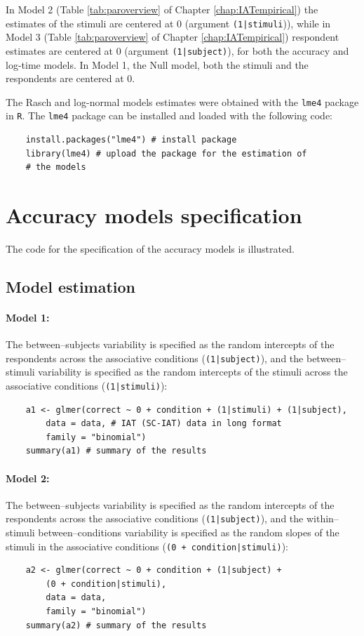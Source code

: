 \documentclass[12pt]{book}
\begin{document}
In Model 2 (Table \ref{tab:paroverview} of Chapter \ref{chap:IATempirical}) the estimates of the stimuli are centered at 0 (argument \texttt{(1|stimuli})), while in Model 3 (Table \ref{tab:paroverview} of Chapter \ref{chap:IATempirical}) respondent estimates are centered at 0 (argument \texttt{(1|subject)}), for both the accuracy and log-time models. 
In Model 1, the Null model, both the stimuli and the respondents are centered at 0. 

The Rasch and log-normal models estimates were obtained with the \texttt{lme4} package \cite{lme4}  in \texttt{R}. 
The \texttt{lme4} package can be installed and loaded with the following code: 
%
\begin{lstlisting}
	install.packages("lme4") # install package
	library(lme4) # upload the package for the estimation of 
	# the models
\end{lstlisting}


\section{Accuracy models specification}


The code for the specification of the accuracy models is illustrated. 

\subsection{Model estimation}

\paragraph*{Model 1:} 

The between--subjects variability is specified as the random intercepts of the respondents across the associative conditions (\texttt{(1|subject)}), and the between--stimuli variability is specified as the random intercepts of the stimuli across the associative conditions (\texttt{(1|stimuli)}):
%
\begin{lstlisting}
	a1 <- glmer(correct ~ 0 + condition + (1|stimuli) + (1|subject), 
		data = data, # IAT (SC-IAT) data in long format
		family = "binomial")
	summary(a1) # summary of the results  
\end{lstlisting}

\paragraph*{Model 2:} The between--subjects variability is specified as the  random intercepts of the respondents across the associative conditions (\texttt{(1|subject)}), and the within--stimuli between--conditions variability is specified as the random slopes of the stimuli in the associative conditions (\texttt{(0 + condition|stimuli)}):
%
\begin{lstlisting}
	a2 <- glmer(correct ~ 0 + condition + (1|subject) + 
		(0 + condition|stimuli), 
		data = data, 
		family = "binomial")
	summary(a2) # summary of the results  
\end{lstlisting}
\end{document}
